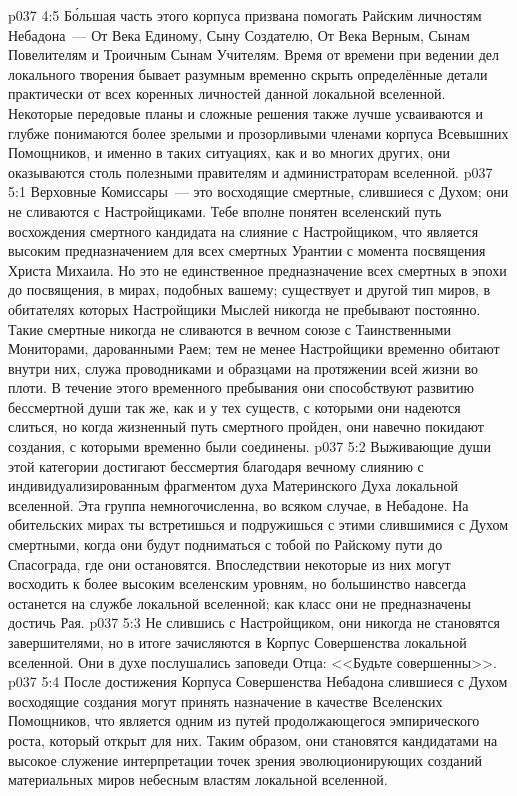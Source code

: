 \vs p037 4:5 Б\'ольшая часть этого корпуса призвана помогать Райским личностям Небадона~--- От Века Единому, Сыну Создателю, От Века Верным, Сынам Повелителям и Троичным Сынам Учителям. Время от времени при ведении дел локального творения бывает разумным временно скрыть определённые детали практически от всех коренных личностей данной локальной вселенной. Некоторые передовые планы и сложные решения также лучше усваиваются и глубже понимаются более зрелыми и прозорливыми членами корпуса Всевышних Помощников, и именно в таких ситуациях, как и во многих других, они оказываются столь полезными правителям и администраторам вселенной.
\vs p037 5:1 Верховные Комиссары~--- это восходящие смертные, слившиеся с Духом; они не сливаются с Настройщиками. Тебе вполне понятен вселенский путь восхождения смертного кандидата на слияние с Настройщиком, что является высоким предназначением для всех смертных Урантии с момента посвящения Христа Михаила. Но это не единственное предназначение всех смертных в эпохи до посвящения, в мирах, подобных вашему; существует и другой тип миров, в обитателях которых Настройщики Мыслей никогда не пребывают постоянно. Такие смертные никогда не сливаются в вечном союзе с Таинственными Мониторами, дарованными Раем; тем не менее Настройщики временно обитают внутри них, служа проводниками и образцами на протяжении всей жизни во плоти. В течение этого временного пребывания они способствуют развитию бессмертной души так же, как и у тех существ, с которыми они надеются слиться, но когда жизненный путь смертного пройден, они навечно покидают создания, с которыми временно были соединены.
\vs p037 5:2 Выживающие души этой категории достигают бессмертия благодаря вечному слиянию с индивидуализированным фрагментом духа Материнского Духа локальной вселенной. Эта группа немногочисленна, во всяком случае, в Небадоне. На обительских мирах ты встретишься и подружишься с этими слившимися с Духом смертными, когда они будут подниматься с тобой по Райскому пути до Спасограда, где они остановятся. Впоследствии некоторые из них могут восходить к более высоким вселенским уровням, но большинство навсегда останется на службе локальной вселенной; как класс они не предназначены достичь Рая.
\vs p037 5:3 Не слившись с Настройщиком, они никогда не становятся завершителями, но в итоге зачисляются в Корпус Совершенства локальной вселенной. Они в духе послушались заповеди Отца: <<Будьте совершенны>>.
\vs p037 5:4 \pc После достижения Корпуса Совершенства Небадона слившиеся с Духом восходящие создания могут принять назначение в качестве Вселенских Помощников, что является одним из путей продолжающегося эмпирического роста, который открыт для них. Таким образом, они становятся кандидатами на высокое служение интерпретации точек зрения эволюционирующих созданий материальных миров небесным властям локальной вселенной.
